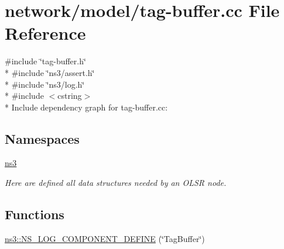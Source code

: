 \hypertarget{tag-buffer_8cc}{}\section{network/model/tag-\/buffer.cc File Reference}
\label{tag-buffer_8cc}
{\ttfamily \#include \char`\"{}tag-\/buffer.\+h\char`\"{}}\\*
{\ttfamily \#include \char`\"{}ns3/assert.\+h\char`\"{}}\\*
{\ttfamily \#include \char`\"{}ns3/log.\+h\char`\"{}}\\*
{\ttfamily \#include $<$cstring$>$}\\*
Include dependency graph for tag-\/buffer.cc\+:
\subsection*{Namespaces}
\begin{DoxyCompactItemize}
\item 
 \hyperlink{namespacens3}{ns3}
\begin{DoxyCompactList}\small\item\em Here are defined all data structures needed by an O\+L\+SR node. \end{DoxyCompactList}\end{DoxyCompactItemize}
\subsection*{Functions}
\begin{DoxyCompactItemize}
\item 
\hyperlink{namespacens3_a5e9709dc108c1700b8f96643e4b74a6d}{ns3\+::\+N\+S\+\_\+\+L\+O\+G\+\_\+\+C\+O\+M\+P\+O\+N\+E\+N\+T\+\_\+\+D\+E\+F\+I\+NE} (\char`\"{}Tag\+Buffer\char`\"{})
\end{DoxyCompactItemize}
